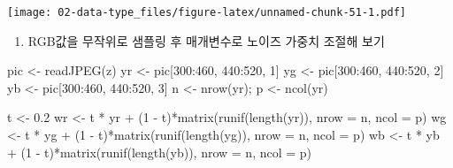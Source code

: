 \documentclass[
  11pt,
]{krantz}
\newenvironment{Shaded}{\begin{snugshade}}{\end{snugshade}}
\newcommand{\AttributeTok}[1]{\textcolor[rgb]{0.61,0.61,0.61}{#1}}
\newcommand{\DecValTok}[1]{\textcolor[rgb]{0.06,0.06,0.06}{#1}}
\newcommand{\FloatTok}[1]{\textcolor[rgb]{0.06,0.06,0.06}{#1}}
\newcommand{\FunctionTok}[1]{\textcolor[rgb]{0,0,0}{#1}}
\newcommand{\NormalTok}[1]{#1}
\newcommand{\OtherTok}[1]{\textcolor[rgb]{0.37,0.37,0.37}{#1}}
\newcommand{\SpecialCharTok}[1]{\textcolor[rgb]{0,0,0}{#1}}
\providecommand{\tightlist}{%
  \setlength{\itemsep}{0pt}\setlength{\parskip}{0pt}}
\begin{document}
\texttt{[image: 02-data-type\_files/figure-latex/unnamed-chunk-51-1.pdf]}

\normalsize

\begin{enumerate}
\def\labelenumi{\arabic{enumi}.}
\setcounter{enumi}{5}
\tightlist
\item
  RGB값을 무작위로 샘플링 후 매개변수로 노이즈 가중치 조절해 보기
\end{enumerate}

\footnotesize

\begin{Shaded}
\begin{Highlighting}[]
\NormalTok{pic }\OtherTok{\textless{}{-}} \FunctionTok{readJPEG}\NormalTok{(z)}
\NormalTok{yr }\OtherTok{\textless{}{-}}\NormalTok{ pic[}\DecValTok{300}\SpecialCharTok{:}\DecValTok{460}\NormalTok{, }\DecValTok{440}\SpecialCharTok{:}\DecValTok{520}\NormalTok{, }\DecValTok{1}\NormalTok{]}
\NormalTok{yg }\OtherTok{\textless{}{-}}\NormalTok{ pic[}\DecValTok{300}\SpecialCharTok{:}\DecValTok{460}\NormalTok{, }\DecValTok{440}\SpecialCharTok{:}\DecValTok{520}\NormalTok{, }\DecValTok{2}\NormalTok{]}
\NormalTok{yb }\OtherTok{\textless{}{-}}\NormalTok{ pic[}\DecValTok{300}\SpecialCharTok{:}\DecValTok{460}\NormalTok{, }\DecValTok{440}\SpecialCharTok{:}\DecValTok{520}\NormalTok{, }\DecValTok{3}\NormalTok{]}
\NormalTok{n }\OtherTok{\textless{}{-}} \FunctionTok{nrow}\NormalTok{(yr); p }\OtherTok{\textless{}{-}} \FunctionTok{ncol}\NormalTok{(yr)}

\NormalTok{t }\OtherTok{\textless{}{-}} \FloatTok{0.2}
\NormalTok{wr }\OtherTok{\textless{}{-}}\NormalTok{ t }\SpecialCharTok{*}\NormalTok{ yr }\SpecialCharTok{+}\NormalTok{ (}\DecValTok{1} \SpecialCharTok{{-}}\NormalTok{ t)}\SpecialCharTok{*}\FunctionTok{matrix}\NormalTok{(}\FunctionTok{runif}\NormalTok{(}\FunctionTok{length}\NormalTok{(yr)), }\AttributeTok{nrow =}\NormalTok{ n, }\AttributeTok{ncol =}\NormalTok{ p)}
\NormalTok{wg }\OtherTok{\textless{}{-}}\NormalTok{ t }\SpecialCharTok{*}\NormalTok{ yg }\SpecialCharTok{+}\NormalTok{ (}\DecValTok{1} \SpecialCharTok{{-}}\NormalTok{ t)}\SpecialCharTok{*}\FunctionTok{matrix}\NormalTok{(}\FunctionTok{runif}\NormalTok{(}\FunctionTok{length}\NormalTok{(yg)), }\AttributeTok{nrow =}\NormalTok{ n, }\AttributeTok{ncol =}\NormalTok{ p)}
\NormalTok{wb }\OtherTok{\textless{}{-}}\NormalTok{ t }\SpecialCharTok{*}\NormalTok{ yb }\SpecialCharTok{+}\NormalTok{ (}\DecValTok{1} \SpecialCharTok{{-}}\NormalTok{ t)}\SpecialCharTok{*}\FunctionTok{matrix}\NormalTok{(}\FunctionTok{runif}\NormalTok{(}\FunctionTok{length}\NormalTok{(yb)), }\AttributeTok{nrow =}\NormalTok{ n, }\AttributeTok{ncol =}\NormalTok{ p)}



\end{Highlighting}
\end{Shaded}
\end{document}
